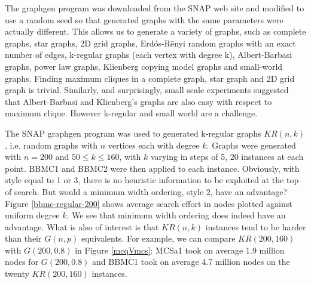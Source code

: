 \documentclass{l4proj}
\begin{document}
The graphgen program was downloaded from the SNAP web site and modified to use a random seed so that generated graphs
with the same parameters were actually different. This allows us to generate a variety of graphs, such as 
complete graphs, star graphs, 2D grid graphs, Erd\'{o}s-R\"{e}nyi random graphs with an exact number of edges, 
k-regular graphs (each vertex with degree k), Albert-Barbasi graphs, power law graphs, Klienberg copying model
graphs and small-world graphs. Finding maximum cliques in a complete graph, star graph and 2D grid graph is trivial.
Similarly, and surprisingly, small scale experiments suggested that Albert-Barbasi and Klienberg's graphs are also easy with respect
to maximum clique. However k-regular and small world are a challenge.

The SNAP graphgen program was used to generated k-regular graphs $KR(n,k)$, i.e. random graphs 
with $n$ vertices each with degree $k$. Graphs were generated with $n=200$ and $50 \leq k \leq 160$,
with $k$ varying in steps of 5, 20 instances at each point. BBMC1 and BBMC2 were then applied to each instance.
Obviously, with style equal to 1 or 3, there is no heuristic information to be exploited at the top of search.
But would a minimum width ordering, style 2, have an advantage? Figure \ref{bbmc-regular-200} shows average search effort
in nodes plotted against uniform degree $k$. We see that minimum width ordering does indeed have an advantage. What is also of
interest is that $KR(n,k)$ instances tend to be harder than their $G(n,p)$ equivalents. For example, we can compare
$KR(200,160)$ with $G(200,0.8)$ in Figure \ref{mcqVmcs}: MCSa1 took on average 1.9 million nodes for $G(200,0.8)$ and
BBMC1 took on average 4.7 million nodes on the twenty $KR(200,160)$ instances.
\end{document}
